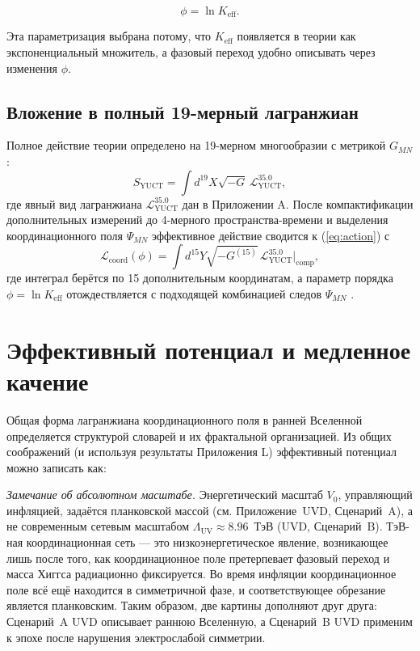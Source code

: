 \documentclass[11pt,a4paper]{article}
\newcommand{\Keff}{K_{\mathrm{eff}}}
\begin{document}
	\begin{equation}
		\phi = \ln \Keff.
		\label{eq:phi-def}
	\end{equation}
	
	Эта параметризация выбрана потому, что \(\Keff\) появляется в теории как экспоненциальный множитель, а фазовый переход удобно описывать через изменения \(\phi\).
	
	\subsection{Вложение в полный 19-мерный лагранжиан}
	
	Полное действие теории определено на 19-мерном многообразии с метрикой \(G_{MN}\):
	\begin{equation}
		S_{\text{YUCT}} = \int d^{19}X \sqrt{-G} \, \mathcal{L}_{\text{YUCT}}^{35.0},
		\label{eq:full-action}
	\end{equation}
	где явный вид лагранжиана \(\mathcal{L}_{\text{YUCT}}^{35.0}\) дан в Приложении A. После компактификации дополнительных измерений до 4-мерного пространства-времени и выделения координационного поля \(\Psi_{MN}\) эффективное действие сводится к (\ref{eq:action}) с
	\begin{equation}
		\mathcal{L}_{\mathrm{coord}}(\phi) = \int d^{15}Y \sqrt{-G^{(15)}} \, \mathcal{L}_{\text{YUCT}}^{35.0}\big|_{\text{comp}},
	\end{equation}
	где интеграл берётся по 15 дополнительным координатам, а параметр порядка \(\phi = \ln\Keff\) отождествляется с подходящей комбинацией следов \(\Psi_{MN}\) \cite{Yakushev2026}.
	
	\section{Эффективный потенциал и медленное качение}
	\label{sec:potential}
	
	Общая форма лагранжиана координационного поля в ранней Вселенной определяется структурой словарей и их фрактальной организацией. Из общих соображений (и используя результаты Приложения L) эффективный потенциал можно записать как:
	
	\noindent\textit{Замечание об абсолютном масштабе.}
	Энергетический масштаб \(V_0\), управляющий инфляцией, задаётся планковской массой (см. Приложение~UVD, Сценарий~A), а не современным сетевым масштабом \(\Lambda_{\mathrm{UV}} \approx 8.96\)~ТэВ (UVD, Сценарий~B). ТэВ-ная координационная сеть — это низкоэнергетическое явление, возникающее лишь после того, как координационное поле претерпевает фазовый переход и масса Хиггса радиационно фиксируется. Во время инфляции координационное поле всё ещё находится в симметричной фазе, и соответствующее обрезание является планковским. Таким образом, две картины дополняют друг друга: Сценарий~A UVD описывает раннюю Вселенную, а Сценарий~B UVD применим к эпохе после нарушения электрослабой симметрии.
	
\end{document}
